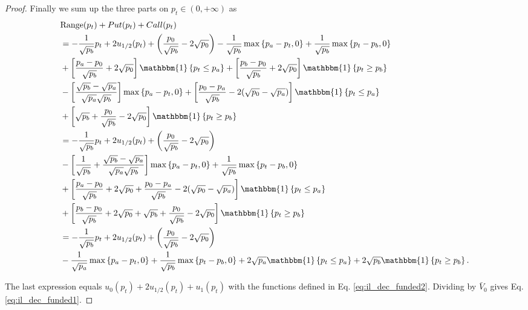 \documentclass[pdftex,11pt,a4paper] {article}
\begin{document}
\begin{proof}
Finally we sum up the three parts on $p_{t}\in(0, +\infty)$ as
\begin{equation} \label{eq:ilf9a}
\begin{split}
 & \mathrm{Range}(p_{t})  + Put(p_{t}) + Call(p_{t}) \\
& = - \frac{1}{\sqrt{p_{b}}} p_{t} + 2u_{1/2}(p_{t})+ \left(\frac{p_{0}}{\sqrt{p_{b}}}-2\sqrt{p_{0}}\right)  - \frac{1}{\sqrt{p_{b}}} \max\left\{ p_{a}-p_{t}, 0\right\} + \frac{1}{\sqrt{p_{b}}} \max\left\{ p_{t}-p_{b}, 0\right\} \\
& + \left[ \frac{p_{a}-p_{0}}{\sqrt{p_{b}}}  + 2\sqrt{p_{0}}  \right]\mathbbm{1}\left\{p_{t}\leq p_{a}\right\} + \left[\frac{p_{b}-p_{0}}{\sqrt{p_{b}}}+2\sqrt{p_{0}} \right]\mathbbm{1}\left\{p_{t} \geq p_{b}\right\}\\
&  -\left[ \frac{\sqrt{p_{b}}-\sqrt{p_{a}}}{\sqrt{p_{a}}\sqrt{p_{b}}}\right] \max \left\{p_{a}-p_{t}, 0 \right\} + \left[\frac{p_{0}-p_{a}}{\sqrt{p_{b}}} - 2(\sqrt{p_{0}}-\sqrt{p_{a}})\right] \mathbbm{1}\left\{p_{t}\leq p_{a}\right\}\\
& + \left[ \sqrt{p_{b}}  + \frac{p_{0}}{\sqrt{p_{b}}}  - 2\sqrt{p_{0}}  \right] \mathbbm{1}\left\{p_{t} \geq p_{b}\right\}\\
& =   - \frac{1}{\sqrt{p_{b}}} p_{t} + 2u_{1/2}(p_{t})+ \left(\frac{p_{0}}{\sqrt{p_{b}}}-2\sqrt{p_{0}}\right)  \\
& -\left[ \frac{1}{\sqrt{p_{b}}} + \frac{\sqrt{p_{b}}-\sqrt{p_{a}}}{\sqrt{p_{a}}\sqrt{p_{b}}} \right]\max\left\{ p_{a}-p_{t}, 0\right\}  + \frac{1}{\sqrt{p_{b}}} \max\left\{ p_{t}-p_{b}, 0\right\} \\
& + \left[ \frac{p_{a}-p_{0}}{\sqrt{p_{b}}}  + 2\sqrt{p_{0}} + \frac{p_{0}-p_{a}}{\sqrt{p_{b}}} - 2(\sqrt{p_{0}}-\sqrt{p_{a}}) \right]\mathbbm{1}\left\{p_{t}\leq p_{a}\right\} \\
& + \left[\frac{p_{b}-p_{0}}{\sqrt{p_{b}}}+2\sqrt{p_{0}}+\sqrt{p_{b}}  + \frac{p_{0}}{\sqrt{p_{b}}}  - 2\sqrt{p_{0}}  \right]\mathbbm{1}\left\{p_{t} \geq p_{b}\right\}\\
& =  - \frac{1}{\sqrt{p_{b}}} p_{t} + 2u_{1/2}(p_{t})+ \left(\frac{p_{0}}{\sqrt{p_{b}}}-2\sqrt{p_{0}}\right) \\
& -\frac{1}{\sqrt{p_{a}}} \max\left\{ p_{a}-p_{t}, 0\right\}  + \frac{1}{\sqrt{p_{b}}} \max\left\{ p_{t}-p_{b}, 0\right\}  + 2\sqrt{p_{a}} \mathbbm{1}\left\{p_{t}\leq p_{a}\right\}  + 2\sqrt{p_{b}}\mathbbm{1}\left\{p_{t} \geq p_{b}\right\}.
\end{split}
\end{equation}

The last expression equals $u_{0}(p_{t}) + 2u_{1/2}(p_{t}) + u_{1}(p_{t})$ with the functions defined in Eq. \eqref{eq:il_dec_funded2}. Dividing by $\bar{V}_{0}$ gives Eq. \eqref{eq:il_dec_funded1}.

\end{proof}
\end{document}
